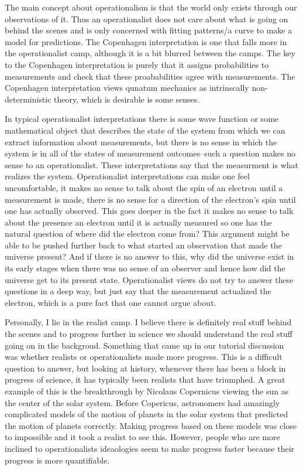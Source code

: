 \documentclass[12pt,a4]{article}
\begin{document}
\begin{enumerate}
\begin{enumerate}
        The main concept about operationalism is that the world only exists through our observations of it.
        Thus an operationalist does not care about what is going on behind the scenes and is only concerned with fitting patterns/a curve to make a model for predictions.
        The Copenhagen interpretation is one that falls more in the operationalist camp, although it is a bit blurred between the camps.
        The key to the Copenhagen interpretation is purely that it assigns probabilities to measurements and check that these proababilities agree with measurements.
        The Copenhagen interpretation views qunatum mechanics as intrinscally non-deterministic theory, which is desirable is some senses.

        In typical operationalist interpretations there is some wave function or some mathematical object that describes the state of the system from which we can extract information about measurements, but there is no sense in which the system is in all of the states of measurement outcomes--such a question makes no sense to an operationalist.
        These interpretations say that the measurment is what realizes the system.
        Operationalist interpretations can make one feel uncomfortable, it makes no sense to talk about the spin of an electron until a measurement is made, there is no sense for a direction of the electron's spin until one has actually observed.
        This goes deeper in the fact it makes no sense to talk about the presence an electron until it is actually measured so one has the natural question of where did the electron come from?
        This argument might be able to be pushed further back to what started an observation that made the universe present? 
        And if there is no answer to this, why did the universe exist in its early stages when there was no sense of an observer and hence how did the universe get to its present state.
        Operationalist views do not try to answer these questions in a deep way, but just say that the measurement actualized the electron, which is a pure fact that one cannot argue about.

        Personally, I lie in the realist camp.
        I believe there is definitely real stuff behind the scenes and to progress further in science we should understand the real stuff going on in the backgroud.
        Something that came up in our tutorial discussion was whether realists or operationalists made more progress.
        This is a difficult question to answer, but looking at history, whenever there has been a block in progress of science, it has typically been realists that have triumphed.
        A great example of this is the breakthrough by Nicolaus Copernicus viewing the sun as the center of the solar system.
        Before Copericus, astronomers had amazingly complicated models of the motion of planets in the solar system that predicted the motion of planets correctly.
        Making progress based on these models was close to impossible and it took a realist to see this.
        However, people who are more inclined to operationalists ideaologies seem to make progress faster because their progress is more quantifiable.


\end{enumerate}
\end{enumerate}
\end{document}
